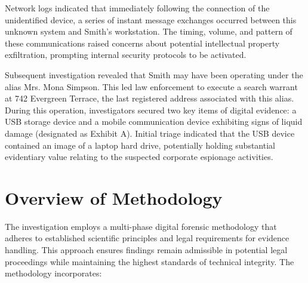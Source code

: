 Network logs indicated that immediately following the connection of the unidentified device, a series of instant message exchanges occurred between this unknown system and Smith's workstation. The timing, volume, and pattern of these communications raised concerns about potential intellectual property exfiltration, prompting internal security protocols to be activated.

Subsequent investigation revealed that Smith may have been operating under the alias Mrs. Mona Simpson. This led law enforcement to execute a search warrant at 742 Evergreen Terrace, the last registered address associated with this alias. During this operation, investigators secured two key items of digital evidence: a USB storage device and a mobile communication device exhibiting signs of liquid damage (designated as Exhibit A). Initial triage indicated that the USB device contained an image of a laptop hard drive, potentially holding substantial evidentiary value relating to the suspected corporate espionage activities.

\section{Overview of Methodology}
The investigation employs a multi-phase digital forensic methodology that adheres to established scientific principles and legal requirements for evidence handling. This approach ensures findings remain admissible in potential legal proceedings while maintaining the highest standards of technical integrity. The methodology incorporates:

